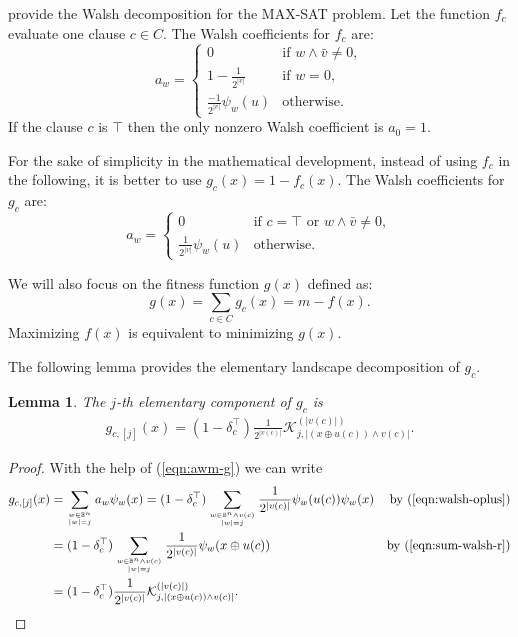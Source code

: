 \documentclass{article}
\newtheorem{lemma}{Lemma}
\newcommand{\Bo}[0]{\mathbb{B}}
\newcommand{\krawel}[3]{\mathcal{K}^{#1}_{#2,#3}}
\begin{document}
\cite{Sutton2009} provide the Walsh decomposition for the MAX-SAT problem. Let the function $f_{c}$ evaluate one clause $c \in C$. 
The Walsh coefficients for $f_c$ are:
\begin{equation}
\label{eqn:awm}
a_w = \left\{
\begin{array}{ll}
0 & \mbox{if $w \wedge \bar{v}\neq 0$}, \\
1 - \frac{1}{2^{|v|}} & \mbox{if $w=0$}, \\
\frac{-1}{2^{|v|}}\psi_{w} (u) & \mbox{otherwise}.
\end{array} 
\right.
\end{equation}
If the clause $c$ is $\top$ then the only nonzero Walsh coefficient is $a_0=1$.

For the sake of simplicity in the mathematical development, instead of using $f_c$ in the following, it is better to use $g_c(x)=1-f_c(x)$. The Walsh coefficients for $g_c$ are:
\begin{equation}
\label{eqn:awm-g}
a_w = \left\{
\begin{array}{ll}
0 & \mbox{if $c=\top$ or $w \wedge \bar{v}\neq 0$}, \\
\frac{1}{2^{|v|}}\psi_{w} (u) & \mbox{otherwise}.
\end{array} 
\right.
\end{equation}

We will also focus on the fitness function $g(x)$ defined as:
\begin{equation}
\label{eqn:g-maxsat}
g(x) = \sum_{c \in C} g_c(x) = m - f(x).
\end{equation}
Maximizing $f(x)$ is equivalent to minimizing $g(x)$.



The following lemma provides the elementary landscape decomposition of $g_{c}$. 
\begin{lemma}
\label{lem:g-eld}
The $j$-th elementary component of $g_{c}$ is
\begin{align}
\label{eqn:g-eld}
g_{c,[j]}(x) = (1-\delta_c^\top)  \frac{1}{2^{|v(c)|}} \krawel{(|v(c)|)}{j}{|(x \oplus u(c)) \wedge v(c)|} .
\end{align}
\end{lemma}
\begin{proof}
With the help of (\ref{eqn:awm-g}) we can write
\begin{align}
g_{c,[j]}(x) &= \sum_{w \in \Bo^n \atop |w|=j} a_w \psi_w(x) = 
(1-\delta_c^\top)  \sum_{w \in \Bo^n \wedge v(c) \atop |w|=j} \frac{1}{2^{|v(c)|}}\psi_{w} (u(c)) \psi_w(x) & \text{by (\ref{eqn:walsh-oplus})} \nonumber \\
&= (1-\delta_c^\top)  \sum_{w \in \Bo^n \wedge v(c) \atop |w|=j} \frac{1}{2^{|v(c)|}}\psi_{w} (x\oplus u(c)) & \text{by (\ref{eqn:sum-walsh-r})} \nonumber \\
&= (1-\delta_c^\top)  \frac{1}{2^{|v(c)|}} \krawel{(|v(c)|)}{j}{|(x \oplus u(c)) \wedge v(c)|} .
\end{align}
\end{proof}
\end{document}
